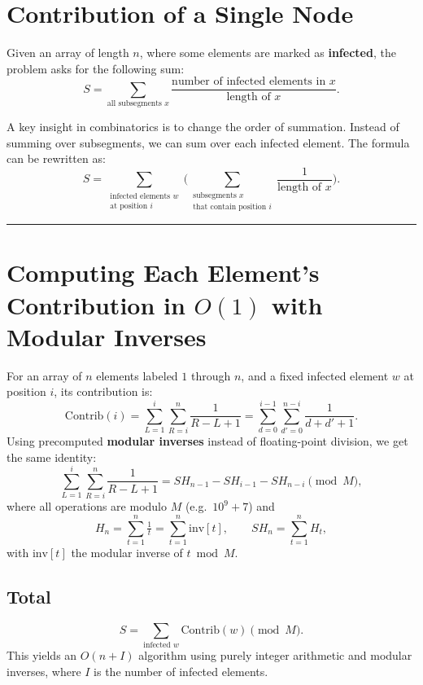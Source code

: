 \documentclass{article}
\begin{document}
\section*{Contribution of a Single Node}

Given an array of length $n$, where some elements are marked as \textbf{infected}, the problem asks for the following sum:
\[
    S = \sum_{\text{all subsegments } x} \frac{\text{number of infected elements in } x}{\text{length of } x}.
\]

A key insight in combinatorics is to change the order of summation. Instead of summing over subsegments, we can sum over each infected element. The formula can be rewritten as:
\[
    S = \sum_{\substack{\text{infected elements } w\\\text{at position } i}}
         \Biggl(\sum_{\substack{\text{subsegments } x\\\text{that contain position } i}}
               \frac{1}{\text{length of } x}\Biggr).
\]

\bigskip\hrule\bigskip

\section*{Computing Each Element’s Contribution in $O(1)$ with Modular Inverses}

For an array of $n$ elements labeled $1$ through $n$, and a fixed infected element $w$ at position $i$, its contribution is:
\[
    \mathrm{Contrib}(i)
    = \sum_{L=1}^{i}\sum_{R=i}^{n}\frac{1}{R-L+1}
    = \sum_{d=0}^{i-1}\sum_{d'=0}^{n-i}\frac{1}{d+d'+1}.
\]
Using precomputed \textbf{modular inverses} instead of floating-point division, we get the same identity:
\[
    \sum_{L=1}^{i}\sum_{R=i}^{n}\frac{1}{R-L+1}
    =
    SH_{n-1} - SH_{i-1} - SH_{n-i}
    \pmod{M},
\]
where all operations are modulo $M$ (e.g.\ $10^9+7$) and
\[
    H_n = \sum_{t=1}^n \tfrac{1}{t} = \sum_{t=1}^n \mathrm{inv}[t],
    \qquad
    SH_n = \sum_{t=1}^n H_t,
\]
with $\mathrm{inv}[t]$ the modular inverse of $t \bmod M$.

\subsection*{Total}
\[
    S = \sum_{\text{infected }w}\mathrm{Contrib}(w) \pmod{M}.
\]
This yields an $O(n + I)$ algorithm using purely integer arithmetic and modular inverses, where $I$ is the number of infected elements.
\end{document}
